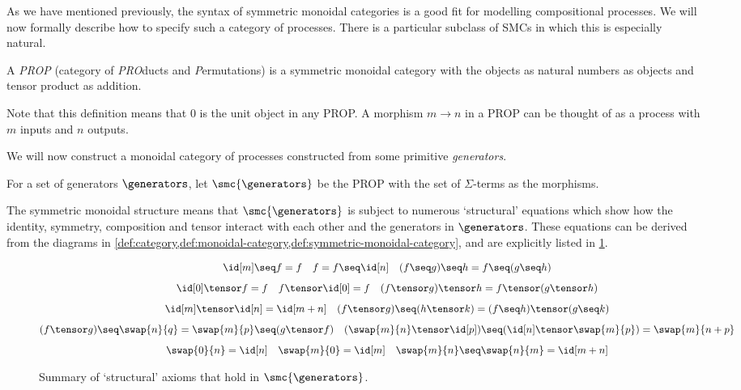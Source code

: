 As we have mentioned previously, the syntax of symmetric monoidal categories is
a good fit for modelling compositional processes.
We will now formally describe how to specify such a category of processes.
There is a particular subclass of SMCs in which this is especially natural.

\begin{definition}
    A \emph{PROP} (category of \emph{PRO}ducts and \emph{P}ermutations) is a
    symmetric monoidal category with the objects as natural numbers as objects
    and tensor product as addition.
\end{definition}

Note that this definition means that \(0\) is the unit object in any PROP.
A morphism \(m \to n\) in a PROP can be thought of as a process with \(m\)
inputs and \(n\) outputs.

We will now construct a monoidal category of processes constructed from some
primitive \emph{generators}.


\begin{definition}
    For a set of generators \(\generators\), let \(\smc{\generators}\) be the
    PROP with the set of \(\Sigma\)-terms as the morphisms.
\end{definition}

The symmetric monoidal structure means that \(\smc{\generators}\) is subject to
numerous `structural' equations which show how the identity, symmetry,
composition and tensor interact with each other and the generators in
\(\generators\).
These equations can be derived from the diagrams in
\cref{def:category,def:monoidal-category,def:symmetric-monoidal-category}, and
are explicitly listed in \cref{fig:prop-axioms}.

\begin{figure}
    \centering
    \begin{gather*}
        \id[m] \seq  f = f
        \quad
        f = f \seq \id[n]
        \quad
        (f \seq g) \seq h = f \seq (g \seq h)
        \\[0.5em]
        \id[0] \tensor f = f
        \quad
        f \tensor \id[0] = f
        \quad
        (f \tensor g) \tensor h = f \tensor (g \tensor h)
        \\[0.5em]
        \id[m] \tensor \id[n] = \id[m+n]
        \quad
        (f \tensor g) \seq (h \tensor k) = (f \seq h) \tensor (g \seq k)
        \\[0.5em]
        (f \tensor g) \seq \swap{n}{q} = \swap{m}{p} \seq (g \tensor f)
        \quad
        (\swap{m}{n} \tensor \id[p]) \seq (\id[n] \tensor \swap{m}{p}) = \swap{m}{n+p}
        \\[0.5em]
        \swap{0}{n} = \id[n]
        \quad
        \swap{m}{0} = \id[m]
        \quad
        \swap{m}{n} \seq \swap{n}{m} = \id[m+n]
    \end{gather*}
    \caption{Summary of `structural' axioms that hold in \(\smc{\generators}\).}
    \label{fig:prop-axioms}
\end{figure}

